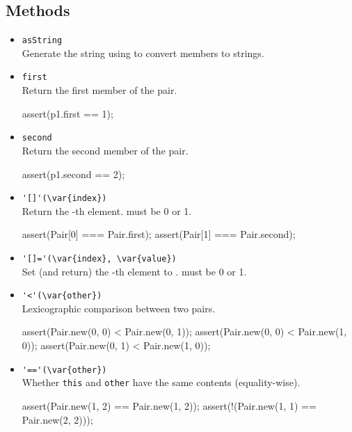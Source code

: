 \subsection{Methods}
\begin{itemize}
\item \lstinline|asString|\\
  Generate the string  using
   to convert members to strings.

\item \lstinline|first|\\
  Return the first member of the pair.
\begin{urbiscript}
assert(p1.first == 1);
\end{urbiscript}

\item \lstinline|second|\\
  Return the second member of the pair.
\begin{urbiscript}
assert(p1.second == 2);
\end{urbiscript}

\item \lstinline|'[]'(\var{index})|\\
  Return the -th element.   must be 0 or 1.
\begin{urbiscript}
assert(Pair[0] === Pair.first);
assert(Pair[1] === Pair.second);
\end{urbiscript}

\item \lstinline|'[]='(\var{index}, \var{value})|\\
  Set (and return) the -th element to .
   must be 0 or 1.

\item \lstinline|'<'(\var{other})|\\
  Lexicographic comparison between two pairs.
\begin{urbiscript}
assert(Pair.new(0, 0) < Pair.new(0, 1));
assert(Pair.new(0, 0) < Pair.new(1, 0));
assert(Pair.new(0, 1) < Pair.new(1, 0));
\end{urbiscript}

\item \lstinline|'=='(\var{other})|\\
  Whether \lstinline|this| and \lstinline|other| have the same
  contents (equality-wise).
\begin{urbiscript}
assert(Pair.new(1, 2) == Pair.new(1, 2));
assert(!(Pair.new(1, 1) == Pair.new(2, 2)));
\end{urbiscript}
\end{itemize}



